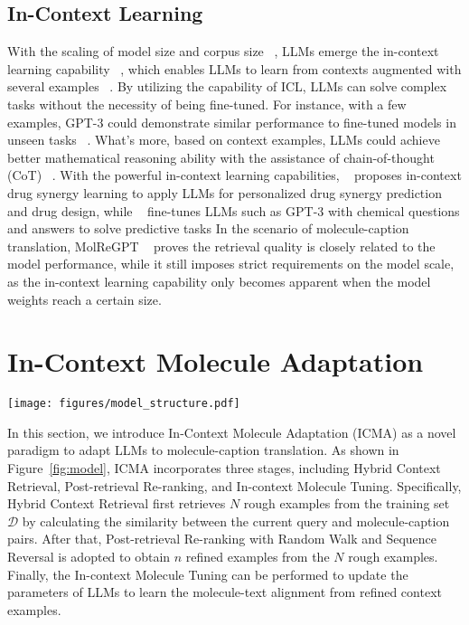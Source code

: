 \subsection{In-Context Learning}
With the scaling of model size and corpus size ~\cite{brown2020language, chowdhery2023palm}, LLMs emerge the in-context learning capability ~\cite{wang2022self}, which enables LLMs to learn from contexts augmented with several examples ~\cite{dong2022survey}. 
By utilizing the capability of ICL, LLMs can solve complex tasks without the necessity of being fine-tuned. 
For instance, with a few examples, GPT-3 could demonstrate similar performance to fine-tuned models in unseen tasks ~\cite{brown2020language}.
What's more, based on context examples, LLMs could achieve better mathematical reasoning ability with the assistance of chain-of-thought (CoT) ~\cite{wei2022chain}.
With the powerful in-context learning capabilities, ~\citet{edwards2023synergpt} proposes in-context drug synergy learning to apply LLMs for personalized drug synergy prediction and drug design, while ~\citet{jablonka2024leveraging} fine-tunes LLMs such as GPT-3 with chemical questions and answers to solve predictive tasks
In the scenario of molecule-caption translation, MolReGPT ~\cite{li2023empowering} proves the retrieval quality is closely related to the model performance, while it still imposes strict requirements on the model scale, as the in-context learning capability only becomes apparent when the model weights reach a certain size.\section{In-Context Molecule Adaptation}
\label{sec:methodlogy}
\begin{figure*}[htb]
    \centering
    \vskip -0.2in
    \texttt{[image: figures/model\_structure.pdf]}
    \vskip -0.1in
    \caption{Framework of In-Context Molecule Adaptation (ICMA). Generally, ICMA consists of three stages, Hybrid Context Retrieval, Post-retrieval Re-ranking, and In-Context Molecule Tuning. 
    }
    \label{fig:model}
    \vskip -0.2in
\end{figure*}

In this section, we introduce In-Context Molecule Adaptation (ICMA) as a novel paradigm to adapt LLMs to molecule-caption translation. As shown in Figure~\ref{fig:model}, ICMA incorporates three stages, including Hybrid Context Retrieval, Post-retrieval Re-ranking, and In-context Molecule Tuning. Specifically, Hybrid Context Retrieval first retrieves $N$ rough examples from the training set $\mathcal{D}$ by calculating the similarity between the current query and molecule-caption pairs. After that, Post-retrieval Re-ranking with Random Walk and Sequence Reversal is adopted to obtain $n$ refined examples from the $N$ rough examples. Finally, the In-context Molecule Tuning can be performed to update the parameters of LLMs to learn the molecule-text alignment from refined context examples. 

